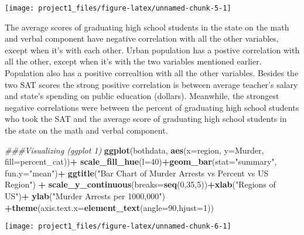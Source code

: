 \documentclass[
]{article}
\newenvironment{Shaded}{\begin{snugshade}}{\end{snugshade}}
\newcommand{\CommentTok}[1]{\textcolor[rgb]{0.56,0.35,0.01}{\textit{#1}}}
\newcommand{\DataTypeTok}[1]{\textcolor[rgb]{0.13,0.29,0.53}{#1}}
\newcommand{\DecValTok}[1]{\textcolor[rgb]{0.00,0.00,0.81}{#1}}
\newcommand{\KeywordTok}[1]{\textcolor[rgb]{0.13,0.29,0.53}{\textbf{#1}}}
\newcommand{\NormalTok}[1]{#1}
\newcommand{\OperatorTok}[1]{\textcolor[rgb]{0.81,0.36,0.00}{\textbf{#1}}}
\newcommand{\StringTok}[1]{\textcolor[rgb]{0.31,0.60,0.02}{#1}}
\begin{document}
\begin{center}\texttt{[image: project1\_files/figure-latex/unnamed-chunk-5-1]} \end{center}

The average scores of graduating high school students in the state on
the math and verbal component have negative correlation with all the
other variables, except when it's with each other. Urban population has
a postive correlation with all the other, except when it's with the two
variables mentioned earlier. Population also has a positive correaltion
with all the other variables. Besides the two SAT scores the strong
positive correlation is between average teacher's salary and state's
spending on public education (dollars). Meanwhile, the strongest
negative correlations were between the percent of graduating high school
students who took the SAT and the average score of graduating high
school students in the state on the math and verbal component.

\begin{Shaded}
\begin{Highlighting}[]
\CommentTok{###Visualizing (ggplot 1)}
\KeywordTok{ggplot}\NormalTok{(bothdata, }\KeywordTok{aes}\NormalTok{(}\DataTypeTok{x=}\NormalTok{region, }\DataTypeTok{y=}\NormalTok{Murder, }\DataTypeTok{fill=}\NormalTok{percent_cat))}\OperatorTok{+}
\StringTok{  }\KeywordTok{scale_fill_hue}\NormalTok{(}\DataTypeTok{l=}\DecValTok{40}\NormalTok{)}\OperatorTok{+}\KeywordTok{geom_bar}\NormalTok{(}\DataTypeTok{stat=}\StringTok{"summary"}\NormalTok{, }\DataTypeTok{fun.y=}\StringTok{"mean"}\NormalTok{)}\OperatorTok{+}
\StringTok{  }\KeywordTok{ggtitle}\NormalTok{(}\StringTok{"Bar Chart of Murder Arrests vs Percent vs US Region"}\NormalTok{) }\OperatorTok{+}
\StringTok{  }\KeywordTok{scale_y_continuous}\NormalTok{(}\DataTypeTok{breaks=}\KeywordTok{seq}\NormalTok{(}\DecValTok{0}\NormalTok{,}\DecValTok{35}\NormalTok{,}\DecValTok{5}\NormalTok{))}\OperatorTok{+}\KeywordTok{xlab}\NormalTok{(}\StringTok{"Regions of US"}\NormalTok{)}\OperatorTok{+}\StringTok{ }
\StringTok{  }\KeywordTok{ylab}\NormalTok{(}\StringTok{"Murder Arrests per 1000,000"}\NormalTok{) }\OperatorTok{+}\KeywordTok{theme}\NormalTok{(}\DataTypeTok{axis.text.x=}\KeywordTok{element_text}\NormalTok{(}\DataTypeTok{angle=}\DecValTok{90}\NormalTok{,}\DataTypeTok{hjust=}\DecValTok{1}\NormalTok{))}
\end{Highlighting}
\end{Shaded}

\begin{center}\texttt{[image: project1\_files/figure-latex/unnamed-chunk-6-1]} \end{center}
\end{document}

